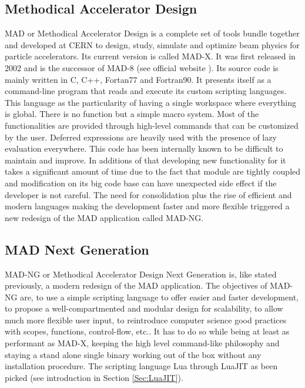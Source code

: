 

\subsection{Methodical Accelerator Design}
\label{Subsec:mad-orig}

MAD or Methodical Accelerator Design is a complete set of tools bundle together
and developed at CERN to design, study, simulate and optimize beam physics for
particle accelerators. Its current version is called MAD-X. It was first released
in 2002 and is the successor of  MAD-8 (see official website \cite{madx}).
Its source code is mainly written in C, C++, Fortan77 and Fortran90.
It presents itself as a command-line program that reads and execute its custom
scripting languages. This language as the particularity of having a single
workspace where everything is global. There is no function but a simple macro
system. Most of the functionalities are provided through high-level commands that
can be customized by the user. Deferred expressions are heavily used with the
presence of lazy evaluation everywhere. This code has been internally known to
be difficult to maintain and improve. In additions of that developing new
functionality for it takes a significant amount of time due to the fact that
module are tightly coupled and modification on its big code base can have
unexpected side effect if the developer is not careful. The need for
consolidation plus the rise of efficient and modern languages making the
development faster and more flexible triggered a new redesign of the MAD
application called MAD-NG.



\subsection{MAD Next Generation}
\label{Subsec:mad-ng}

MAD-NG or Methodical Accelerator Design Next Generation is, like stated previously,
a modern redesign of the MAD application. The objectives of MAD-NG are, to use
a simple scripting language to offer easier and faster development, to propose
a well-compartmented and modular design for scalability, to allow much more
flexible user input, to reintroduce computer science good practices with scopes,
functions, control-flow, etc.. It has to do so while being at least as performant
as MAD-X, keeping the high level command-like philosophy and staying a stand
alone single binary working out of the box without any installation procedure.
The scripting language Lua through LuaJIT as been picked (see introduction in
Section \ref{Sec:LuaJIT}).\\


